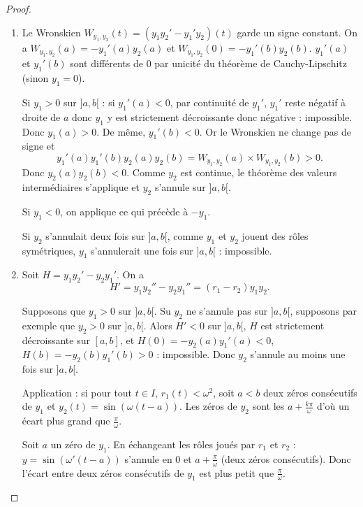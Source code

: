 \documentclass[12pt]{article}
\begin{document}
\begin{proof}
	\phantom{}
	\begin{enumerate}
		\item Le Wronskien $W_{y_1,y_2}(t)=(y_1 y_2'-y_1' y_2)(t)$ garde un signe constant. On a $W_{y_1,y_2}(a)=-y_1'(a)y_2(a)$ et $W_{y_1,y_2}(0)=-y_1'(b)y_2(b)$. $y_1'(a)$ et $y_1'(b)$ sont différents de 0 par unicité du théorème de Cauchy-Lipschitz (sinon $y_1=0$).
		
		Si $y_1>0$ sur $]a,b[$ : si $y_1'(a)<0$, par continuité de $y_1'$, $y_1'$ reste négatif à droite de $a$ donc $y_1$ y est strictement décroissante donc négative : impossible. Donc $y_1(a)>0$. De même, $y_1'(b)<0$. Or le Wronskien ne change pas de signe et 
		\begin{equation}
			y_1'(a)y_1'(b)y_2(a) y_2(b)=W_{y_1,y_2}(a)\times W_{y_1,y_2}(b)>0.
		\end{equation}
		Donc $y_2(a) y_2(b)<0$. Comme $y_2$ est continue, le théorème des valeurs intermédiaires s'applique et $y_2$ s'annule sur $]a,b[$. 

		Si $y_1<0$, on applique ce qui précède à $-y_1$.

		Si $y_2$ s'annulait deux fois sur $]a,b[$, comme $y_1$ et $y_2$ jouent des rôles symétriques, $y_1$ s'annulerait une fois sur $]a,b[$ : impossible.

		\item Soit $H=y_1 y_2'-y_2 y_1'$. On a 
		\begin{equation}
			H'=y_1 y_2''-y_2 y_1''=(r_1-r_2)y_1 y_2.
		\end{equation}

		Supposons que $y_1>0$ sur $]a,b[$. Su $y_2$ ne s'annule pas sur $]a,b[$, supposons par exemple que $y_2>0$ sur $]a,b[$. Alors $H'<0$ sur $]a,b[$, $H$ est strictement décroissante sur $[a,b]$, et $H(0)=-y_2(a) y_1'(a)<0$, $H(b)=-y_2(b) y_1'(b)>0$ : impossible. Donc $y_2$ s'annule au moins une fois sur $]a,b[$.

		Application : si pour tout $t\in I$, $r_1(t)<\omega^{2}$, soit $a<b$ deux zéros consécutifs de $y_1$ et $y_2(t)=\sin(\omega(t-a))$. Les zéros de $y_2$ sont les $a+\frac{k\pi}{\omega}$ d'où un écart plus grand que $\frac{\pi}{\omega}$.

		Soit $a$ un zéro de $y_1$. En échangeant les rôles joués par $r_1$ et $r_2$ : $y=\sin(\omega'(t-a))$ s'annule en $0$ et $a+\frac{\pi}{\omega}$ (deux zéros consécutifs). Donc l'écart entre deux zéros consécutifs de $y_1$ est plus petit que $\frac{\pi}{\omega}$.
	\end{enumerate}
\end{proof}
\end{document}
